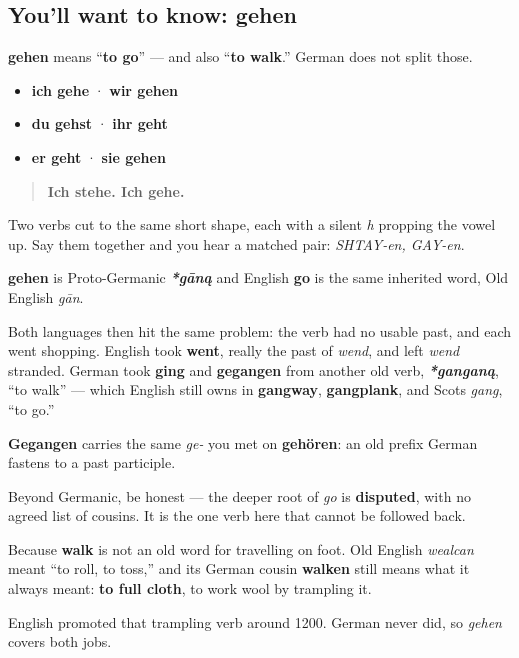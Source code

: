 \subsection*{You'll want to know: gehen}
\textbf{gehen} means \textquotedblleft{}\textbf{to go}\textquotedblright{} — and also \textquotedblleft{}\textbf{to walk}.\textquotedblright{} German does not split those.

\begin{itemize}
\raggedright
  \item \textbf{ich gehe} · \textbf{wir gehen}
  \item \textbf{du gehst} · \textbf{ihr geht}
  \item \textbf{er geht} · \textbf{sie gehen}
\end{itemize}

\begin{quote}
\textbf{Ich stehe. Ich gehe.}
\end{quote}

Two verbs cut to the same short shape, each with a silent \emph{h} propping the vowel up. Say them together and you hear a matched pair: \emph{SHTAY-en, GAY-en}.

\begin{cousinweb}
\textbf{gehen} is Proto-Germanic \emph{\textbf{*gāną}} and English \textbf{go} is the same inherited word, Old English \emph{gān}.

Both languages then hit the same problem: the verb had no usable past, and each went shopping. English took \textbf{went}, really the past of \emph{wend}, and left \emph{wend} stranded. German took \textbf{ging} and \textbf{gegangen} from another old verb, \emph{\textbf{*ganganą}}, \textquotedblleft{}to walk\textquotedblright{} — which English still owns in \textbf{gangway}, \textbf{gangplank}, and Scots \emph{gang}, \textquotedblleft{}to go.\textquotedblright{}

\textbf{Gegangen} carries the same \emph{ge-} you met on \textbf{gehören}: an old prefix German fastens to a past participle.

Beyond Germanic, be honest — the deeper root of \emph{go} is \textbf{disputed}, with no agreed list of cousins. It is the one verb here that cannot be followed back.
\end{cousinweb}

\begin{culture}
Because \textbf{walk} is not an old word for travelling on foot. Old English \emph{wealcan} meant \textquotedblleft{}to roll, to toss,\textquotedblright{} and its German cousin \textbf{walken} still means what it always meant: \textbf{to full cloth}, to work wool by trampling it.

English promoted that trampling verb around 1200. German never did, so \emph{gehen} covers both jobs.
\end{culture}


